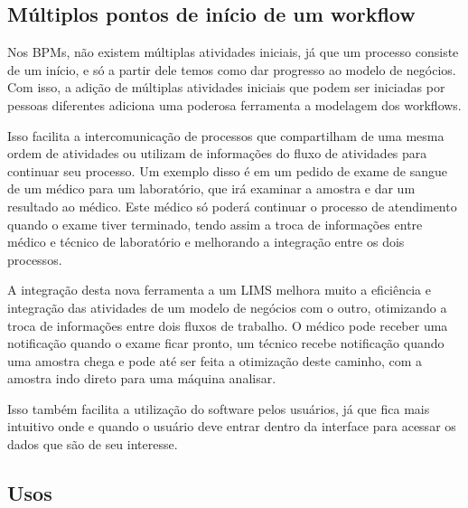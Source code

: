 \subsection{Múltiplos pontos de início de um workflow}




Nos BPMs, não existem múltiplas atividades iniciais, já que um processo consiste de um início, e só a partir dele temos como dar progresso ao modelo de negócios. Com isso, a adição de múltiplas atividades iniciais que podem ser iniciadas por pessoas diferentes adiciona uma poderosa ferramenta a modelagem dos workflows.


Isso facilita a intercomunicação de processos que compartilham de uma mesma ordem de atividades ou utilizam de informações do fluxo de atividades para continuar seu processo. Um exemplo disso é em um pedido de exame de sangue de um médico para um laboratório, que irá examinar a amostra e dar um resultado ao médico. Este médico só poderá continuar o processo de atendimento quando o exame tiver terminado, tendo assim a troca de informações entre médico e técnico de laboratório e melhorando a integração entre os dois processos.


A integração desta nova ferramenta a um LIMS melhora muito a eficiência e integração das atividades de um modelo de negócios com o outro, otimizando a troca de informações entre dois fluxos de trabalho. O médico pode receber uma notificação quando o exame ficar pronto, um técnico recebe notificação quando uma amostra chega e pode até ser feita a otimização deste caminho, com a amostra indo direto para uma máquina analisar.

Isso também facilita a utilização do software pelos usuários, já que fica mais intuitivo onde e quando o usuário deve entrar dentro da interface para acessar os dados que são de seu interesse.


\subsection{Usos}


